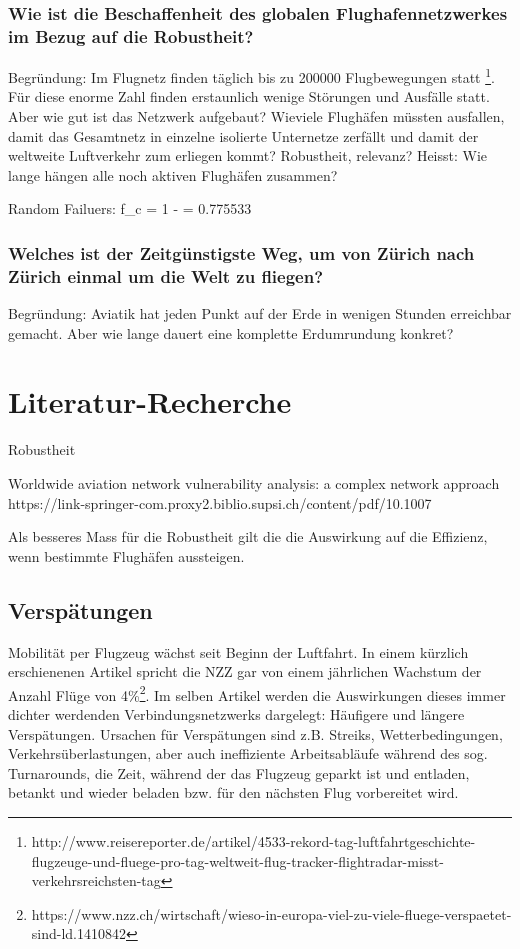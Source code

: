 \subsubsection{Wie ist die Beschaffenheit des globalen Flughafennetzwerkes im Bezug auf die Robustheit?}
Begründung: Im Flugnetz finden täglich bis zu 200000 Flugbewegungen statt \footnote{http://www.reisereporter.de/artikel/4533-rekord-tag-luftfahrtgeschichte-flugzeuge-und-fluege-pro-tag-weltweit-flug-tracker-flightradar-misst-verkehrsreichsten-tag}.
Für diese enorme Zahl finden erstaunlich wenige Störungen und Ausfälle statt.
Aber wie gut ist das Netzwerk aufgebaut?
Wieviele Flughäfen müssten ausfallen, damit das Gesamtnetz in einzelne isolierte Unternetze zerfällt und damit der weltweite Luftverkehr zum erliegen kommt?
Robustheit, relevanz? Heisst: Wie lange hängen alle noch aktiven Flughäfen zusammen?

Random Failuers: f_c = 1 -  = 0.775533

\subsubsection{Welches ist der Zeitgünstigste Weg, um von Zürich nach Zürich einmal um die Welt zu fliegen?}
Begründung: Aviatik hat jeden Punkt auf der Erde in wenigen Stunden erreichbar gemacht. Aber wie lange dauert eine komplette Erdumrundung konkret?

\section{Literatur-Recherche}
\label{subsec:literature-research}

Robustheit

\guillemotleft Worldwide aviation network vulnerability analysis: a complex network approach \guillemotright
https://link-springer-com.proxy2.biblio.supsi.ch/content/pdf/10.1007%

Als besseres Mass für die Robustheit gilt die die Auswirkung auf die Effizienz, wenn bestimmte Flughäfen aussteigen.


\subsection{Verspätungen}
Mobilität per Flugzeug wächst seit Beginn der Luftfahrt.
In einem kürzlich erschienenen Artikel spricht die NZZ gar von einem jährlichen Wachstum der Anzahl Flüge von 4\%\footnote{https://www.nzz.ch/wirtschaft/wieso-in-europa-viel-zu-viele-fluege-verspaetet-sind-ld.1410842}.
Im selben Artikel werden die Auswirkungen dieses immer dichter werdenden Verbindungsnetzwerks dargelegt: Häufigere und längere Verspätungen.
Ursachen für Verspätungen sind z.B. Streiks, Wetterbedingungen, Verkehrsüberlastungen, aber auch ineffiziente Arbeitsabläufe während des sog. \guillemotleft Turnarounds\guillemotright,
die Zeit, während der das Flugzeug geparkt ist und entladen, betankt und wieder beladen bzw. für den nächsten Flug vorbereitet wird.

